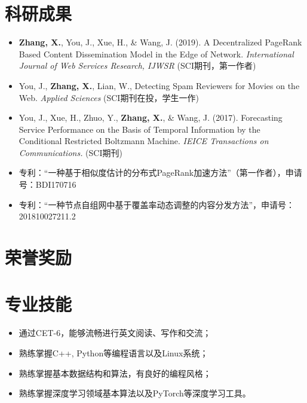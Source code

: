 \documentclass{resume}
\begin{document}
\section{科研成果}
\begin{itemize}[parsep=0.5ex]
  \item \textbf{Zhang, X.}, You, J., Xue, H., \& Wang, J. (2019). A Decentralized PageRank Based Content Dissemination Model in the Edge of Network. \textit{International Journal of Web Services Research, IJWSR} (SCI期刊，第一作者)
  \item You, J., \textbf{Zhang, X.}, Lian, W., Detecting Spam Reviewers for Movies on the Web. \textit{Applied Sciences} (SCI期刊在投，学生一作)
  \item You, J., Xue, H., Zhuo, Y., \textbf{Zhang, X.}, \& Wang, J. (2017). Forecasting Service Performance on the Basis of Temporal Information by the Conditional Restricted Boltzmann Machine. \textit{IEICE Transactions on Communications.} (SCI期刊)
  \item 专利：“一种基于相似度估计的分布式PageRank加速方法”（第一作者），申请号：BDI170716
  \item 专利：“一种节点自组网中基于覆盖率动态调整的内容分发方法”，申请号：201810027211.2
\end{itemize}

\section{荣誉奖励}



\section{专业技能}
\begin{itemize}[parsep=0.5ex]
  \item 通过CET-6，能够流畅进行英文阅读、写作和交流；
  \item 熟练掌握C++, Python等编程语言以及Linux系统；
  \item 熟练掌握基本数据结构和算法，有良好的编程风格；
  \item 熟练掌握深度学习领域基本算法以及PyTorch等深度学习工具。
\end{itemize}
\end{document}
